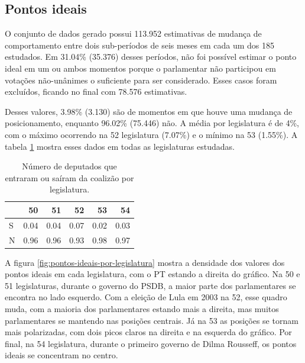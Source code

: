 \documentclass[a4paper,titlepage]{ppgi}\usepackage[]{graphicx}\usepackage[]{color}
\newenvironment{knitrout}{}{} %
\begin{document}
\subsection{Pontos ideais}



O conjunto de dados gerado possui 113.952 estimativas de mudança
de comportamento entre dois sub-períodos de seis meses em cada um dos
185 estudados. Em 31.04\% (35.376) desses períodos, não foi possível
estimar o ponto ideal em um ou ambos momentos porque o parlamentar não
participou em votações não-unânimes o suficiente para ser considerado. Esses
casos foram excluídos, ficando no final com 78.576 estimativas.

Desses valores, 3.98\%
(3.130) são de momentos em que houve uma mudança de
posicionamento, enquanto 96.02\% (75.446) não. A média por legislatura é de
4\%, com o
máximo ocorrendo na 52\textordfeminine{} legislatura
(7.07\%) e o
mínimo na 53\textordfeminine{}
(1.55\%).
A tabela \ref{table:coalition-changes-per-legislature} mostra esses dados em
todas as legislaturas estudadas.

\begin{table}
\centering
\begin{knitrout}
\color{fgcolor}
\begin{tabular}{l|r|r|r|r|r}
\hline
  & 50 & 51 & 52 & 53 & 54\\
\hline
S & 0.04 & 0.04 & 0.07 & 0.02 & 0.03\\
\hline
N & 0.96 & 0.96 & 0.93 & 0.98 & 0.97\\
\hline
\end{tabular}


\end{knitrout}
\caption{Número de deputados que entraram ou saíram da coalizão por legislatura.}
\label{table:coalition-changes-per-legislature}
\end{table}

A figura \ref{fig:pontos-ideais-por-legislatura} mostra a densidade dos valores
dos pontos ideais em cada legislatura, com o PT estando a direita do gráfico.
Na 50\textordfeminine{} e 51\textordfeminine{} legislaturas, durante o governo
do PSDB, a maior parte dos parlamentares se encontra no lado esquerdo. Com a
eleição de Lula em 2003 na 52\textordfeminine{}, esse quadro muda, com a
maioria dos parlamentares estando mais a direita, mas muitos parlamentares
se mantendo nas posições centrais. Já na 53\textordfeminine{} as posições se
tornam mais polarizadas, com dois picos claros na direita e na esquerda do
gráfico. Por final, na 54\textordfeminine{} legislatura, durante o primeiro
governo de Dilma Rousseff, os pontos ideais se concentram no centro.
\end{document}
